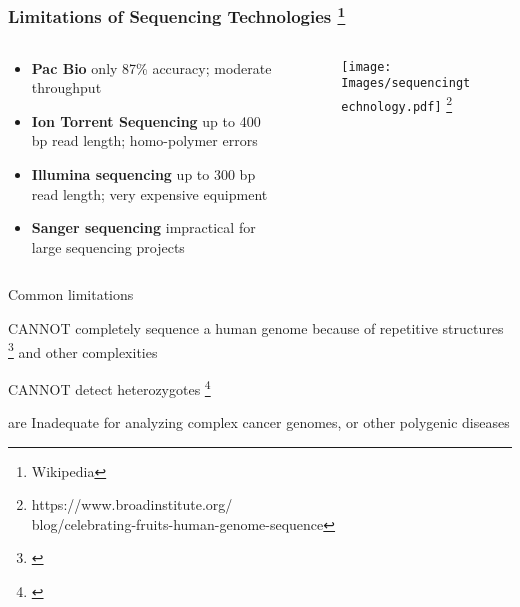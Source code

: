 \documentclass[10pt,dvipsnames,table]{beamer}
\begin{document}
\begin{frame}
\frametitle{Limitations of Sequencing Technologies \footnote{\tiny{Wikipedia}} }
\vspace{-0.8cm}
\begin{columns}[t]
\begin{column}{0.6\textwidth}
\begin{itemize} 

\item {\bf{\small{Pac Bio}}}
{\footnotesize{only 87\% accuracy; moderate throughput }}

\item {\bf{\small{Ion Torrent Sequencing}}}
{\footnotesize{up to 400 bp read length; homo-polymer errors }}

\item {\bf{\small{Illumina sequencing}}}
{\footnotesize{up to 300 bp read length; very expensive equipment}}

\item {\bf{\small{Sanger sequencing}}}
{\footnotesize{impractical for large sequencing projects}}

\end{itemize}
\end{column}

\begin{column}{0.4\textwidth}
\begin{center}
\begin{figure}[t]
\texttt{[image: Images/sequencingtechnology.pdf]} \footnote{\tiny{https://www.broadinstitute.org/ \\blog/celebrating-fruits-human-genome-sequence}}
\end{figure}
\end{center}
\end{column}

\end{columns}

\begin{block}{Common limitations}
\begin{itemize}
{\small{
\item CANNOT completely sequence a human genome because of repetitive structures \footnote{\cite{Lander_etal_2001_Nature}} and other complexities
\item CANNOT detect heterozygotes \footnote{\cite{Wheeler_etal_2008_Nature}}
\item are Inadequate for analyzing complex cancer genomes, or other polygenic diseases
}}
\end{itemize}
\end{block}
\note{}
\end{frame}
\end{document}
